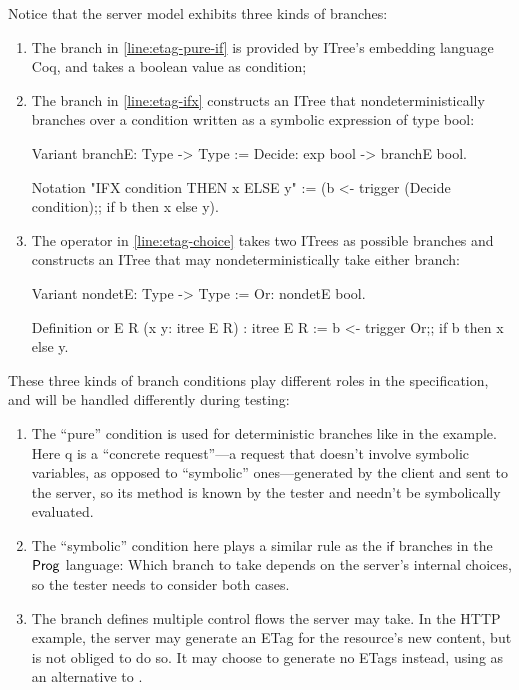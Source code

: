 Notice that the server model exhibits three kinds of branches:
\begin{enumerate}
\item The  branch in \autoref{line:etag-pure-if} is provided by ITree's
embedding language Coq, and takes a boolean value as condition;
\item The  branch in \autoref{line:etag-ifx} constructs an ITree that
nondeterministically branches over a condition written as a symbolic expression
of type bool:
\begin{coq}
  Variant branchE: Type -> Type :=
    Decide: exp bool -> branchE bool.

  Notation "IFX condition THEN x ELSE y" :=
    (b <- trigger (Decide condition);;
     if b then x else y).
\end{coq}
\item The  operator in \autoref{line:etag-choice} takes two ITrees as
possible branches and constructs an ITree that may nondeterministically take
either branch:
\begin{coq}
  Variant nondetE: Type -> Type :=
    Or: nondetE bool.

  Definition or {E R} (x y: itree E R) : itree E R :=
    b <- trigger Or;;
    if b then x else y.
\end{coq}
\end{enumerate}

These three kinds of branch conditions play different roles in the
specification, and will be handled differently during testing:
\begin{enumerate}
\item The ``pure''  condition is used for deterministic branches like
   in the example.  Here \ilc q is a ``concrete
  request''---a request that doesn't involve symbolic variables, as opposed to
  ``symbolic'' ones---generated by the client and sent to the server, so its
  method is known by the tester and needn't be symbolically evaluated.
\item The ``symbolic''  condition here plays a similar rule as the
  $\mathsf{if}$ branches in the $\mathsf{Prog}$ language: Which branch to take depends
  on the server's internal choices, so the tester needs to consider both cases.
\item The  branch defines multiple control flows the server may take.
  In the HTTP example, the server may generate an ETag for the resource's new
  content, but is not obliged to do so.  It may choose to generate no ETags
  instead, using  as an alternative
  to .
\end{enumerate}

